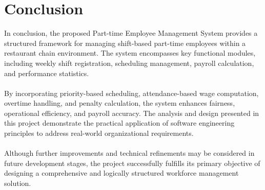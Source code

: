 \chapter*{Conclusion}
In conclusion, the proposed Part-time Employee Management System provides a structured framework for managing shift-based part-time employees within a restaurant chain environment. The system encompasses key functional modules, including weekly shift registration, scheduling management, payroll calculation, and performance statistics.
\\\\
By incorporating priority-based scheduling, attendance-based wage computation, overtime handling, and penalty calculation, the system enhances fairness, operational efficiency, and payroll accuracy. The analysis and design presented in this project demonstrate the practical application of software engineering principles to address real-world organizational requirements.
\\\\
Although further improvements and technical refinements may be considered in future development stages, the project successfully fulfills its primary objective of designing a comprehensive and logically structured workforce management solution.
